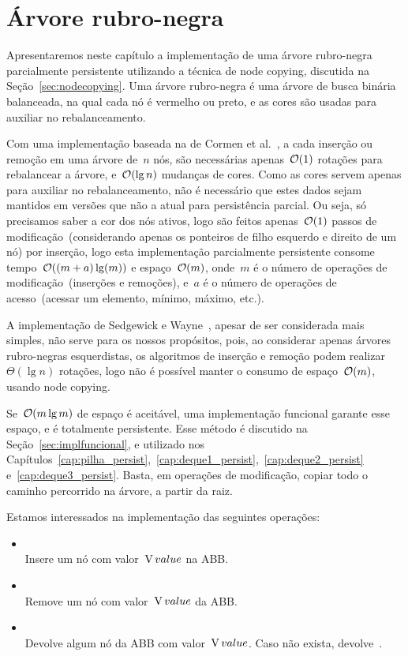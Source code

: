 \documentclass[main.tex]{subfiles}
\begin{document}
\chapter{Árvore rubro-negra} \label{cap:rubronegra_persist}

Apresentaremos neste capítulo a implementação de uma árvore rubro-negra parcialmente persistente utilizando a técnica de node copying, discutida na Seção~\ref{sec:nodecopying}. Uma árvore rubro-negra é uma árvore de busca binária balanceada, na qual cada nó é vermelho ou preto, e as cores são usadas para auxiliar no rebalanceamento.

Com uma implementação baseada na de Cormen et al.~\cite[Cap. 13]{CLRS}, a cada inserção ou remoção em uma árvore de~$n$ nós, são necessárias apenas~$\mathcal{O}(1)$ rotações para rebalancear a árvore, e~$\mathcal{O}(\lg n)$ mudanças de cores. Como as cores servem apenas para auxiliar no rebalanceamento, não é necessário que estes dados sejam mantidos em versões que não a atual para persistência parcial. Ou seja, só precisamos saber a cor dos nós ativos, logo são feitos apenas~$\mathcal{O}(1)$ passos de modificação~(considerando apenas os ponteiros de filho esquerdo e direito de um nó) por inserção, logo esta implementação parcialmente persistente consome tempo~$\mathcal{O}((m + a) \lg(m))$ e espaço~$\mathcal{O}(m)$, onde~$m$ é o número de operações de modificação~(inserções e remoções), e~$a$ é o número de operações de acesso~(acessar um elemento, mínimo, máximo, etc.).

A implementação de Sedgewick e Wayne~\cite{SedgewickRedBlack}, apesar de ser considerada mais simples, não serve para os nossos propósitos, pois, ao considerar apenas árvores rubro-negras esquerdistas, os algoritmos de inserção e remoção podem realizar~$\Theta(\lg n)$ rotações, logo não é possível manter o consumo de espaço~$\mathcal{O}(m)$, usando node copying.

Se~$\mathcal{O}(m \lg m)$ de espaço é aceitável, uma implementação funcional garante esse espaço, e é totalmente persistente. Esse método é discutido na Seção~\ref{sec:implfuncional}, e utilizado nos Capítulos~\ref{cap:pilha_persist},~\ref{cap:deque1_persist},~\ref{cap:deque2_persist} e~\ref{cap:deque3_persist}. Basta, em operações de modificação, copiar todo o caminho percorrido na árvore, a partir da raiz.

Estamos interessados na implementação das seguintes operações:

\begin{itemize}
	\item {}
		\\ Insere um nó com valor~$\operatorname{V}{value}$ na ABB.
	\item {}
		\\ Remove um nó com valor~$\operatorname{V}{value}$ da ABB.
	\item {}
		\\ Devolve algum nó da ABB com valor~$\operatorname{V}{value}$. Caso não exista, devolve~.
\end{itemize}
\end{document}
